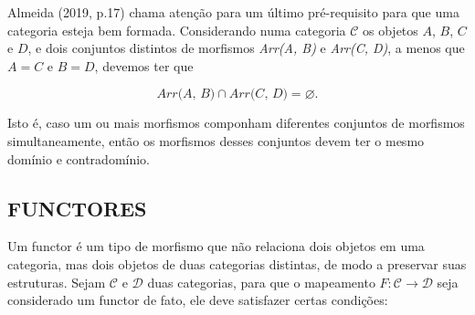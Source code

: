 \documentclass[12pt,a4paper]{article}
\begin{document}
Almeida (2019, p.17) chama atenção para um último pré-requisito para que uma categoria esteja bem formada. Considerando numa categoria $\mathcal{C}$ os objetos $A$, $B$, $C$ e $D$, e dois conjuntos distintos de morfismos \textit{Arr(A, B)} e \textit{Arr(C, D)}, a menos que $A = C$ e $B = D$, devemos ter que

\[
    \textit{Arr(A, B)} \cap \textit{Arr(C, D)} = \varnothing. 
\]
  
Isto é, caso um ou mais morfismos componham diferentes conjuntos de morfismos simultaneamente, então os morfismos desses conjuntos devem ter o mesmo domínio e contradomínio.

\subsection{FUNCTORES}
\label{sec:fun}

Um functor é um tipo de morfismo que não relaciona dois objetos em uma categoria, mas dois objetos de duas categorias distintas, de modo a preservar suas estruturas. Sejam $\mathcal{C}$ e $\mathcal{D}$ duas categorias, para que o mapeamento $F: \mathcal{C} \to \mathcal{D}$ seja considerado um functor de fato, ele deve satisfazer certas condições:
\end{document}
